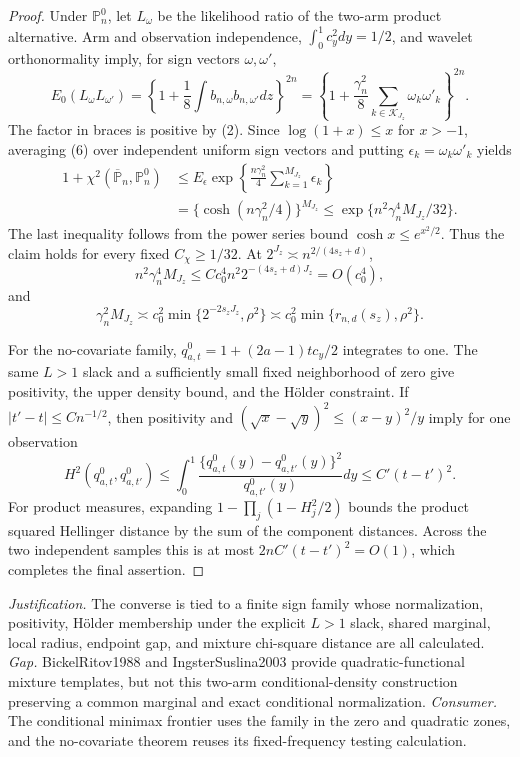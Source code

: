 \documentclass{article}
\begin{document}
\begin{proof}
Under \(\mathbb P_n^0\), let \(L_\omega\) be the likelihood ratio of the two-arm product alternative.  Arm and observation independence, \(\int_0^1c_y^2dy=1/2\), and wavelet orthonormality imply, for sign vectors \(\omega,\omega'\),
\[
E_0(L_\omega L_{\omega'})
=\left\{1+\frac18\int b_{n,\omega}b_{n,\omega'}dz\right\}^{2n}
=\left\{1+\frac{\gamma_n^2}{8}
\sum_{k\in\mathcal K_{J_z}}\omega_k\omega'_k\right\}^{2n}.              \tag{6}
\]
The factor in braces is positive by (2).  Since \(\log(1+x)\le x\) for \(x>-1\), averaging (6) over independent uniform sign vectors and putting \(\epsilon_k=\omega_k\omega'_k\) yields
\[
\begin{aligned}
1+\chi^2(\overline{\mathbb P}_n,\mathbb P_n^0)
&\le E_\epsilon\exp\left\{\frac{n\gamma_n^2}{4}
\sum_{k=1}^{M_{J_z}}\epsilon_k\right\}\\
&=\{\cosh(n\gamma_n^2/4)\}^{M_{J_z}}
\le\exp\{n^2\gamma_n^4M_{J_z}/32\}.
\end{aligned}                                                             \tag{7}
\]
The last inequality follows from the power series bound \(\cosh x\le e^{x^2/2}\).  Thus the claim holds for every fixed \(C_\chi\ge1/32\).  At \(2^{J_z}\asymp n^{2/(4s_z+d)}\),
\[
n^2\gamma_n^4M_{J_z}
\le Cc_0^4n^2 2^{-(4s_z+d)J_z}=O(c_0^4),
\]
and
\[
\gamma_n^2M_{J_z}
\asymp c_0^2\min\{2^{-2s_zJ_z},\rho^2\}
\asymp c_0^2\min\{r_{n,d}(s_z),\rho^2\}.                                \tag{8}
\]

For the no-covariate family, \(q_{a,t}^0=1+(2a-1)tc_y/2\) integrates to one.  The same \(L>1\) slack and a sufficiently small fixed neighborhood of zero give positivity, the upper density bound, and the H\"older constraint.  If \(|t'-t|\le Cn^{-1/2}\), then positivity and \((\sqrt x-\sqrt y)^2\le(x-y)^2/y\) imply for one observation
\[
H^2(q_{a,t}^0,q_{a,t'}^0)
\le\int_0^1\frac{\{q_{a,t}^0(y)-q_{a,t'}^0(y)\}^2}{q_{a,t'}^0(y)}dy
\le C'(t-t')^2.
\]
For product measures, expanding \(1-\prod_j(1-H_j^2/2)\) bounds the product squared Hellinger distance by the sum of the component distances.  Across the two independent samples this is at most \(2nC'(t-t')^2=O(1)\), which completes the final assertion.
\end{proof}
\par\smallskip\noindent \textit{Justification.} The converse is tied to a finite sign family whose normalization, positivity, H\"older membership under the explicit \(L>1\) slack, shared marginal, local radius, endpoint gap, and mixture chi-square distance are all calculated. \textit{Gap.} BickelRitov1988 and IngsterSuslina2003 provide quadratic-functional mixture templates, but not this two-arm conditional-density construction preserving a common marginal and exact conditional normalization. \textit{Consumer.} The conditional minimax frontier uses the family in the zero and quadratic zones, and the no-covariate theorem reuses its fixed-frequency testing calculation.
\end{document}
